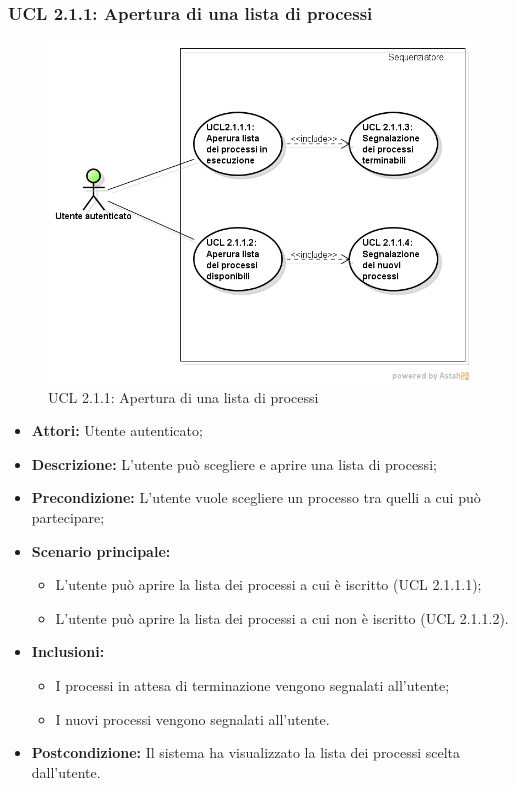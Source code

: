 \hypertarget{L2.1.1}{}
\subsubsection{UCL 2.1.1: Apertura di una lista di processi}
\begin{figure}[H]
\centering
\includegraphics[trim=0cm 0.8cm 0cm 0cm,clip=true,width=%
\textwidth]
{./grafici/L211}
\caption{UCL 2.1.1: Apertura di una lista di processi}
\end{figure}
\begin{itemize}
\item \textbf{Attori:} Utente autenticato;
\item \textbf{Descrizione:} L'utente può scegliere e aprire una lista di processi;
\item \textbf{Precondizione:} L'utente vuole scegliere un processo tra quelli a cui può partecipare;
\item \textbf{Scenario principale:}
\begin{itemize}
\item L'utente può aprire la lista dei processi a cui è iscritto (UCL 2.1.1.1);
\item L'utente può aprire la lista dei processi a cui non è iscritto (UCL 2.1.1.2).
\end{itemize}
\item \textbf{Inclusioni:}
\begin{itemize}
\item I processi in attesa di terminazione vengono segnalati all'utente;
\item I nuovi processi vengono segnalati all'utente.
\end{itemize}
\item \textbf{Postcondizione:} Il sistema ha visualizzato la lista dei processi scelta dall'utente.
\end{itemize}

